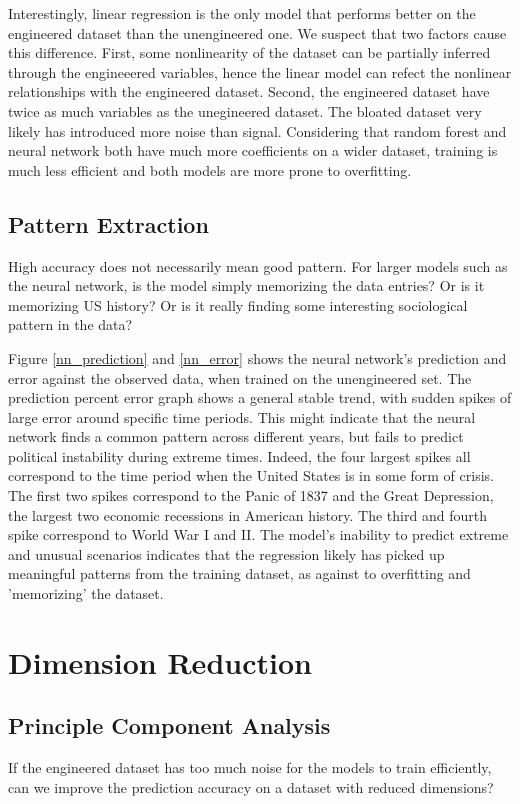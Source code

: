 \documentclass[twocolumn]{article}
\begin{document}
Interestingly, linear regression is the only model that performs better on the engineered dataset than the unengineered one. We suspect that two factors cause this difference. First, some nonlinearity of the dataset can be partially inferred through the engineeered variables, hence the linear model can refect the nonlinear relationships with the engineered dataset. Second, the engineered dataset have twice as much variables as the unegineered dataset. The bloated dataset very likely has introduced more noise than signal. Considering that random forest and neural network both have much more coefficients on a wider dataset, training is much less efficient and both models are more prone to overfitting.

\subsection{Pattern Extraction}
High accuracy does not necessarily mean good pattern. For larger models such as the neural network, is the model simply memorizing the data entries? Or is it memorizing US history? Or is it really finding some interesting sociological pattern in the data?

Figure \ref{nn_prediction} and \ref{nn_error} shows the neural network's prediction and error against the observed data, when trained on the unengineered set. The prediction percent error graph shows a general stable trend, with sudden spikes of large error around specific time periods. This might indicate that the neural network finds a common pattern across different years, but fails to predict political instability during extreme times. Indeed, the four largest spikes all correspond to the time period when the United States is in some form of crisis. The first two spikes correspond to the Panic of 1837 and the Great Depression, the largest two economic recessions in American history. The third and fourth spike correspond to World War I and II. The model's inability to predict extreme and unusual scenarios indicates that the regression likely has picked up meaningful patterns from the training dataset, as against to overfitting and 'memorizing' the dataset.

\section{Dimension Reduction}

\subsection{Principle Component Analysis}
If the engineered dataset has too much noise for the models to train efficiently, can we improve the prediction accuracy on a dataset with reduced dimensions?
\end{document}
